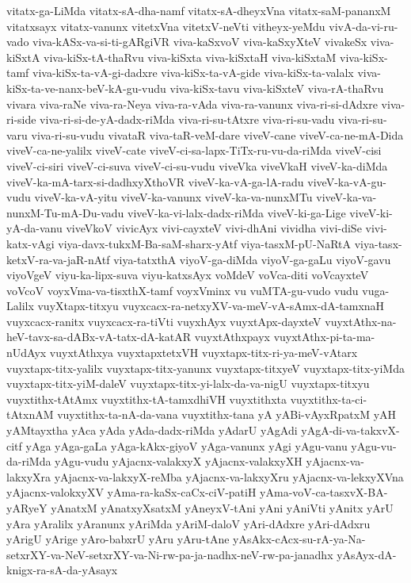 {vitatx-ga-LiMda
vitatx-sA-dha-namf
vitatx-sA-dheyxVna
vitatx-saM-pananxM
vitatxsayx
vitatx-vanunx
vitetxVna
vitetxV-neVti
vitheyx-yeMdu
vivA-da-vi-ru-vado
viva-kASx-va-si-ti-gARgiVR
viva-kaSxvoV
viva-kaSxyXteV
vivakeSx
viva-kiSxtA
viva-kiSx-tA-thaRvu
viva-kiSxta
viva-kiSxtaH
viva-kiSxtaM
viva-kiSx-tamf
viva-kiSx-ta-vA-gi-dadxre
viva-kiSx-ta-vA-gide
viva-kiSx-ta-valalx
viva-kiSx-ta-ve-nanx-beV-kA-gu-vudu
viva-kiSx-tavu
viva-kiSxteV
viva-rA-thaRvu
vivara
viva-raNe
viva-ra-Neya
viva-ra-vAda
viva-ra-vanunx
viva-ri-si-dAdxre
viva-ri-side
viva-ri-si-de-yA-dadx-riMda
viva-ri-su-tAtxre
viva-ri-su-vadu
viva-ri-su-varu
viva-ri-su-vudu
vivataR
viva-taR-veM-dare
viveV-cane
viveV-ca-ne-mA-Dida
viveV-ca-ne-yalilx
viveV-cate
viveV-ci-sa-lapx-TiTx-ru-vu-da-riMda
viveV-cisi
viveV-ci-siri
viveV-ci-suva
viveV-ci-su-vudu
viveVka
viveVkaH
viveV-ka-diMda
viveV-ka-mA-tarx-si-dadhxyXthoVR
viveV-ka-vA-ga-lA-radu
viveV-ka-vA-gu-vudu
viveV-ka-vA-yitu
viveV-ka-vanunx
viveV-ka-va-nunxMTu
viveV-ka-va-nunxM-Tu-mA-Du-vadu
viveV-ka-vi-lalx-dadx-riMda
viveV-ki-ga-Lige
viveV-ki-yA-da-vanu
viveVkoV
vivicAyx
vivi-cayxteV
vivi-dhAni
vividha
vivi-diSe
vivi-katx-vAgi
viya-davx-tukxM-Ba-saM-sharx-yAtf
viya-tasxM-pU-NaRtA
viya-tasx-ketxV-ra-va-jaR-nAtf
viya-tatxthA
viyoV-ga-diMda
viyoV-ga-gaLu
viyoV-gavu
viyoVgeV
viyu-ka-lipx-suva
viyu-katxsAyx
voMdeV
voVca-diti
voVcayxteV
voVcoV
voyxVma-va-tisxthX-tamf
voyxVminx
vu
vuMTA-gu-vudo
vudu
vuga-Lalilx
vuyXtapx-titxyu
vuyxcacx-ra-netxyXV-va-meV-vA-sAmx-dA-tamxnaH
vuyxcacx-ranitx
vuyxcacx-ra-tiVti
vuyxhAyx
vuyxtApx-dayxteV
vuyxtAthx-na-heV-tavx-sa-dABx-vA-tatx-dA-katAR
vuyxtAthxpayx
vuyxtAthx-pi-ta-ma-nUdAyx
vuyxtAthxya
vuyxtapxtetxVH
vuyxtapx-titx-ri-ya-meV-vAtarx
vuyxtapx-titx-yalilx
vuyxtapx-titx-yanunx
vuyxtapx-titxyeV
vuyxtapx-titx-yiMda
vuyxtapx-titx-yiM-daleV
vuyxtapx-titx-yi-lalx-da-va-nigU
vuyxtapx-titxyu
vuyxtithx-tAtAmx
vuyxtithx-tA-tamxdhiVH
vuyxtithxta
vuyxtithx-ta-ci-tAtxnAM
vuyxtithx-ta-nA-da-vana
vuyxtithx-tana
yA
yABi-vAyxRpatxM
yAH
yAMtayxtha
yAca
yAda
yAda-dadx-riMda
yAdarU
yAgAdi
yAgA-di-va-takxvX-citf
yAga
yAga-gaLa
yAga-kAkx-giyoV
yAga-vanunx
yAgi
yAgu-vanu
yAgu-vu-da-riMda
yAgu-vudu
yAjacnx-valakxyX
yAjacnx-valakxyXH
yAjacnx-va-lakxyXra
yAjacnx-va-lakxyX-reMba
yAjacnx-va-lakxyXru
yAjacnx-va-lekxyXVna
yAjacnx-valokxyXV
yAma-ra-kaSx-caCx-ciV-patiH
yAma-voV-ca-tasxvX-BA-yARyeY
yAnatxM
yAnatxyXsatxM
yAneyxV-tAni
yAni
yAniVti
yAnitx
yArU
yAra
yAralilx
yAranunx
yAriMda
yAriM-daloV
yAri-dAdxre
yAri-dAdxru
yArigU
yArige
yAro-babxrU
yAru
yAru-tAne
yAsAkx-cAcx-su-rA-ya-Na-setxrXY-va-NeV-setxrXY-va-Ni-rw-pa-ja-nadhx-neV-rw-pa-janadhx
yAsAyx-dA-knigx-ra-sA-da-yAsayx
}
